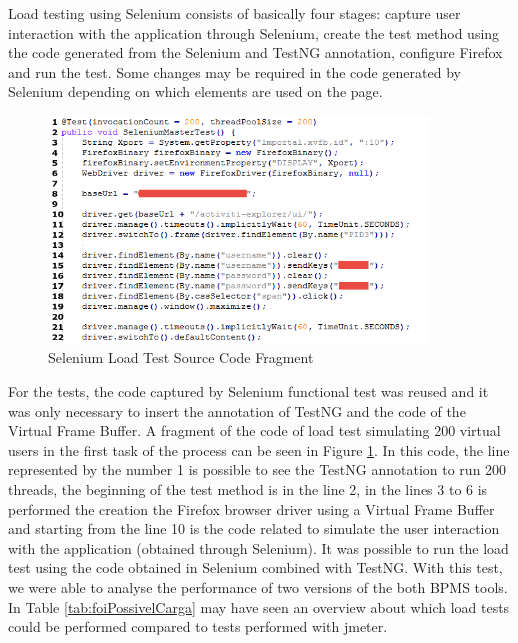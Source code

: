 \documentclass[runningheads,a4paper]{llncs}
\begin{document}
Load testing using Selenium consists of basically four stages: capture user interaction with the application through Selenium, create the test method using the code generated from the Selenium and TestNG annotation, configure Firefox and run the test. Some changes may be required in the code generated by Selenium depending on which elements are used on the page.

\begin{figure}[ht]
\centering
\includegraphics[width=0.9\textwidth]{figuras/codigo3.png}
\caption{Selenium Load Test Source Code Fragment}
\label{fig:codigoCargaSelenium}
\end{figure}

For the tests, the code captured by Selenium functional test was reused and it was only necessary to insert the annotation of TestNG and the code of the Virtual Frame Buffer. A fragment of the code of load test simulating 200 virtual users in the first task of the process can be seen in Figure \ref{fig:codigoCargaSelenium}. In this code, the line represented by the number 1 is possible to see the TestNG annotation to run 200 threads, the beginning of the test method is in the line 2, in the lines 3 to 6 is performed the creation the Firefox browser driver using a Virtual Frame Buffer and starting from the line 10 is the code related to simulate the user interaction with the application (obtained through Selenium). It was possible to run the load test using the code obtained in Selenium combined with TestNG. With this test, we were able to analyse the performance of two versions of the both BPMS tools. In Table \ref{tab:foiPossivelCarga} may have seen an overview about which load tests could be performed compared to tests performed with jmeter. 
\end{document}
